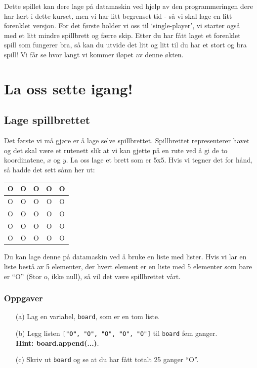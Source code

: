 \documentclass[a4paper, 11pt, notitlepage]{article}
\begin{document}
Dette spillet kan dere lage på datamaskin ved hjelp av den programmeringen dere har lært i dette kurset, men vi har litt begrenset tid - så vi skal lage en litt forenklet versjon. For det første holder vi oss til `single-player', vi starter også med et litt mindre spillbrett og færre skip. Etter du har fått laget et forenklet spill som fungerer bra, så kan du utvide det litt og litt til du har et stort og bra spill! Vi får se hvor langt vi kommer iløpet av denne økten.

\section*{La oss sette igang!}

\subsection*{Lage spillbrettet}
Det første vi må gjøre er å lage selve spillbrettet. Spillbrettet representerer havet og det skal være et rutenett slik at vi kan gjette på en rute ved å gi de to koordinatene, $x$ og $y$. La oss lage et brett som er 5x5. Hvis vi tegner det for hånd, så hadde det sett sånn her ut:

\begin{center}
\begin{tabular}{|c|c|c|c|c|}
\hline 
O & O & O & O & O \\ \hline
O & O & O & O & O \\ \hline
O & O & O & O & O \\ \hline
O & O & O & O & O \\ \hline
O & O & O & O & O \\ \hline
\end{tabular}
\end{center}

Du kan lage denne på datamaskin ved å bruke en liste med lister. Hvis vi lar en liste bestå av 5 elementer, der hvert element er en liste med 5 elementer som bare er ``O'' (Stor o, ikke null), så vil det være spillbrettet vårt.

\subsubsection*{Oppgaver}
\begin{itemize}
	\item[(a)] Lag en variabel, \verb+board+, som er en tom liste.
	\item[(b)] Legg listen \verb+["O", "O", "O", "O", "O"]+ til \verb+board+ fem ganger. \\ \textbf{Hint: board.append(...)}.
	\item[(c)] Skriv ut \verb+board+ og se at du har fått totalt 25 ganger ``O''.
\end{itemize}
\end{document}

